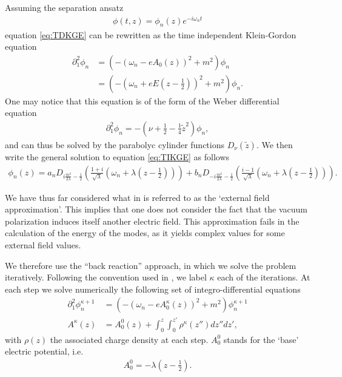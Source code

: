 Assuming the separation ansatz 
\begin{align}
	\phi(t, z) = \phi_n(z) e^{-i\omega_n t}
\end{align}
equation \ref{eq:TDKGE} can be rewritten as the time independent Klein-Gordon equation
\begin{align}
	\partial_1^2 \phi_n &=
	\left( - (\omega_n - e A_0(z))^2 + m^2 \right) \phi_n\\
			    \label{eq:TIKGE}
			    &=\left( - \left(\omega_n + e E \left( z - \frac{1}{2} \right) \right)^2 + m^2 \right) \phi_n.
\end{align}
One may notice that this equation is of the form of the Weber differential equation
\begin{align}
	\partial_1^2 \phi_n = - \left( \nu + \frac{1}{2}-\frac{1}{4}\tilde{z}^2 \right) \phi_n,
\end{align}
and can thus be solved by the parabolyc cylinder functions $D_\nu\left( \tilde{z} \right) $. 
We then write the general solution to equation \ref{eq:TIKGE} as follows
\begin{align}
	\phi_n(z) = 
	a_n D_{i \frac{m^2}{2\lambda} - \frac{1}{2}} \left( 
		\frac{1+i}{\sqrt{\lambda} }
		\left( \omega_n + \lambda \left( z-\frac{1}{2} \right)
		\right) 
	\right) 
	+
	b_n D_{-i \frac{m^2}{2\lambda} - \frac{1}{2}} \left( 
		\frac{i - 1}{\sqrt{\lambda} }
		\left( \omega_n + \lambda \left( z-\frac{1}{2} \right)
		\right) 
	\right). 
\end{align}

We have thus far considered what in \cite{Ambjorn1983} is referred to as the `external field approximation'. This implies that one does not consider the fact that the vacuum polarization induces itself another electric field. This approximation fails \cite{Ambjorn1983} in the calculation of the energy of the modes, as it yields complex values for some external field values.


We therefore use the ``back reaction'' approach, in which we solve the problem iteratively. Following the convention used in \cite{Ambjorn1983}, we label $\kappa$ each of the iterations. At each step we solve numerically the following set of integro-differential equations
\begin{align}
	\partial_1^2 \phi^{\kappa+1}_n &=
	\left( - (\omega_n - e A^{\kappa}_0(z))^2 + m^2 \right) \phi^{\kappa+1}_n\\
	A^{\kappa}(z) &= A_0^{0}(z) + \int_{0}^{z} \int_{0}^{z'} \rho^{\kappa}(z'')dz''dz'
,
\end{align}
with $\rho(z)$ the associated charge density at each step.
$A_0^{0}$ stands for the `base' electric potential, i.e. 
\begin{align}
	A_0^{0} = -\lambda \left(z-\frac{1}{2}  \right).
\end{align} 

